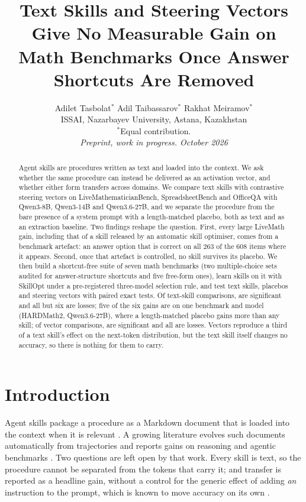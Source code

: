 \documentclass[11pt]{article}
\title{Text Skills and Steering Vectors Give No Measurable Gain on\\Math Benchmarks Once Answer Shortcuts Are Removed}
\author{Adilet Tasbolat$^{*}$ \quad Adil Taibassarov$^{*}$ \quad Rakhat Meiramov$^{*}$ \\
  ISSAI, Nazarbayev University, Astana, Kazakhstan \\
  {\normalfont\small $^{*}$Equal contribution.} \\
  \textit{Preprint, work in progress. October 2026}}
\begin{document}
\maketitle

\begin{abstract}
Agent skills are procedures written as text and loaded into the context. We ask whether the same
procedure can instead be delivered as an activation vector, and whether either form transfers
across domains. We compare text skills with contrastive steering vectors on LiveMathematicianBench,
SpreadsheetBench and OfficeQA with Qwen3-8B, Qwen3-14B and Qwen3.6-27B, and we separate the
procedure from the bare presence of a system prompt with a length-matched placebo, both as text and
as an extraction baseline. Two findings reshape the question. First, every large LiveMath gain,
including that of a skill released by an automatic skill optimiser, comes from a benchmark artefact:
an answer option that is correct on all 263 of the 608 items where it appears. Second, once that
artefact is controlled, no skill survives its placebo. We then build a shortcut-free suite of seven
math benchmarks (two multiple-choice sets audited for answer-structure shortcuts and five
free-form ones), learn skills on it with SkillOpt under a pre-registered three-model selection
rule, and test text skills, placebos and steering vectors with paired exact tests. Of
\nTextTests{} text-skill comparisons, \nTextSig{} are significant and all but six are losses; five of the
six gains are on one benchmark and model (HARDMath2, Qwen3.6-27B), where a length-matched placebo
gains more than any skill; of
\nVecTests{} vector comparisons, \nVecSig{} are significant and all are losses. Vectors reproduce a
third of a text skill's effect on the next-token distribution, but the text skill itself changes
no accuracy, so there is nothing for them to carry.
\end{abstract}

\section{Introduction}

Agent skills package a procedure as a Markdown document that is loaded into the context when it is
relevant \citep{anthropic2025skills}. A growing literature evolves such documents automatically from
trajectories and reports gains on reasoning and agentic benchmarks
\citep{alzubi2026evoskill,ni2026trace2skill,yang2026skillopt,tang2026wikiskill}. Two questions are
left open by that work. Every skill is text, so the procedure cannot be separated from the tokens
that carry it; and transfer is reported as a headline gain, without a control for the generic effect
of adding \emph{an} instruction to the prompt, which is known to move accuracy on its own
\citep{webson2022prompts,sclar2024formatting}.
\end{document}
